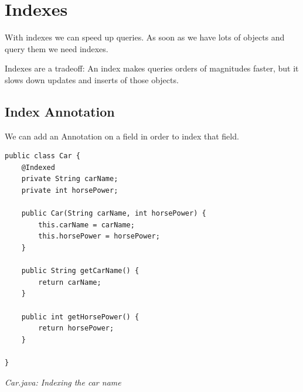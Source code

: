 
\chapter{Indexes}
\label{tut:indexes}

With indexes we can speed up queries. As soon as we have lots of objects and query them we need indexes.

Indexes are a tradeoff: An index makes queries orders of magnitudes faster, but it slows down updates and inserts of those objects.

\section*{Index Annotation}

We can add an Annotation on a field in order to index that field.

\begin{lstlisting}
public class Car {
    @Indexed
    private String carName;
    private int horsePower;

    public Car(String carName, int horsePower) {
        this.carName = carName;
        this.horsePower = horsePower;
    }

    public String getCarName() {
        return carName;
    }

    public int getHorsePower() {
        return horsePower;
    }

}
\end{lstlisting}

{\small\itshape Car.java: Indexing the car name\par}
\medskip


